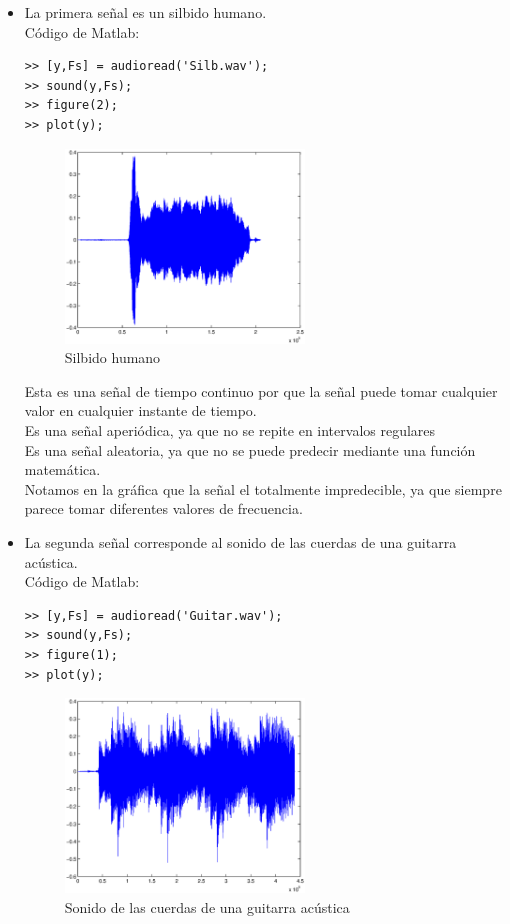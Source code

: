 \documentclass[10pt,a4paper]{report}
\begin{document}
\begin{itemize}
\item La primera señal es un silbido humano.\\
Código de Matlab:\\
\begin{lstlisting}[frame=single]
>> [y,Fs] = audioread('Silb.wav');
>> sound(y,Fs);
>> figure(2);
>> plot(y);
\end{lstlisting}

\begin{figure}[htb]
\centering
\includegraphics[width=0.6\textwidth]{SilbGraphic}
\caption{Silbido humano}
\label{fig:SilbGraphic}
\end{figure}

Esta es una señal de tiempo continuo por que la señal puede tomar cualquier valor en cualquier instante de tiempo. \\
Es una señal aperiódica, ya que no se repite en intervalos regulares \\
Es una señal aleatoria, ya que no se puede predecir mediante una función matemática.\\
Notamos en la gráfica que la señal el totalmente impredecible, ya que siempre parece tomar diferentes valores de frecuencia.

\item La segunda señal corresponde al sonido de las cuerdas de una guitarra acústica.\\
Código de Matlab:\\
\begin{lstlisting}[frame=single]
>> [y,Fs] = audioread('Guitar.wav');
>> sound(y,Fs);
>> figure(1);
>> plot(y);
\end{lstlisting}

\begin{figure}[H]
\centering
\includegraphics[width=0.6\textwidth]{GuitarGraphic}
\caption{Sonido de las cuerdas de una guitarra acústica}
\label{fig:GuitarGraphic}
\end{figure}


\end{itemize}
\end{document}

